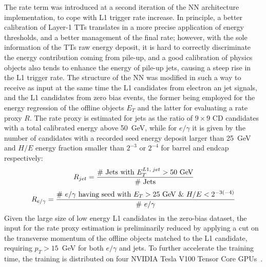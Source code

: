 The rate term was introduced at a second iteration of the NN architecture implementation, to cope with L1 trigger rate increase. In principle, a better calibration of Layer-1 TTs translates in a more precise application of energy thresholds, and a better management of the final rate; however, with the sole information of the TTs raw energy deposit, it is hard to correctly discriminate the energy contribution coming from pile-up, and a good calibration of physics objects also tends to enhance the energy of pile-up jets, causing a steep rise in the L1 trigger rate.
The structure of the NN was modified in such a way to receive as input at the same time the L1 candidates from electron an jet signals, and the L1 candidates from zero bias events, the former being employed for the energy regression of the offline objects $E_T$ and the latter for evaluating a rate proxy $R$.
The rate proxy is estimated for jets as the ratio of $9\times9$ CD candidates with a total calibrated energy above 50~GeV, while for $e/\gamma$ it is given by the number of candidates with a recorded seed energy deposit larger than 25~GeV and $H/E$ energy fraction smaller than $2^{-3}$ or $2^{-4}$ for barrel and endcap respectively:
\begin{equation}
    R_{jet} = \frac{\#~\textnormal{Jets with }E_T^{L1,\;jet} > 50~\textnormal{GeV}}{\#~\textnormal{Jets}}
\end{equation}
\begin{equation}
    R_{e/\gamma} = \frac{\#~e/\gamma~\textnormal{having seed with }E_T > 25~\textnormal{GeV}~\&~H/E < 2^{-3(-4)}}{\#~e/\gamma}
\end{equation}
Given the large size of low energy L1 candidates in the zero-bias dataset, the input for the rate proxy estimation is preliminarily reduced by applying a cut on the transverse momentum of the offline objects matched to the L1 candidate, requiring $p_T>15$~GeV for both $e/\gamma$ and jets.
To further accelerate the training time, the training is distributed on four NVIDIA Tesla V100 Tensor Core GPUs~\cite{NVIDIAgpu}. 

\bigbreak

